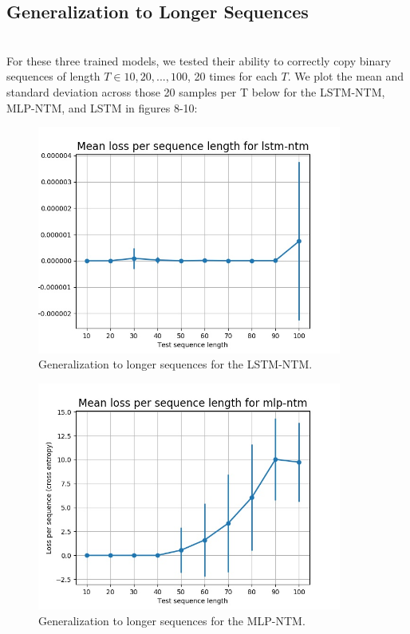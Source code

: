 \documentclass{amsart}
\numberwithin{equation}{section}
\theoremstyle{definition}
\theoremstyle{remark}
\begin{document}
\subsection{Generalization to Longer Sequences} \\

For these three trained models, we tested their ability to correctly copy
binary sequences of length $T \in {10, 20, ..., 100}$, 20 times for each $T$.
We plot the mean and standard deviation across those 20 samples per T below
for the LSTM-NTM, MLP-NTM, and LSTM in figures 8-10: \\

\begin{figure}[h]
\includegraphics[width=100mm]{outputs/lstm-ntm_loss-eval}
\caption{Generalization to longer sequences for the LSTM-NTM.}
\label{Figure 8}
\end{figure}

\begin{figure}[h]
\includegraphics[width=100mm]{outputs/mlp-ntm_loss-eval}
\caption{Generalization to longer sequences for the MLP-NTM.}
\label{Figure 9}
\end{figure}
\end{document}

